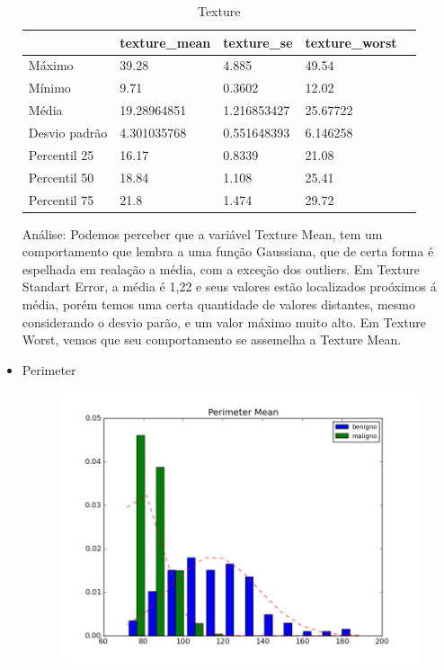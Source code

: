 \documentclass[11pt,a4paper]{article}
\numberwithin{equation}{section}
\begin{document}
\begin{itemize}
\begin{table}[H]
\centering
\caption{Texture}
\label{my-label}
\begin{tabular}{lllll}
\hline
              & texture\_mean & texture\_se & texture\_worst &  \\ \hline
Máximo        & 39.28         & 4.885       & 49.54          &  \\
Mínimo        & 9.71          & 0.3602      & 12.02          &  \\
Média         & 19.28964851   & 1.216853427 & 25.67722       &  \\
Desvio padrão & 4.301035768   & 0.551648393 & 6.146258       &  \\
Percentil 25  & 16.17         & 0.8339      & 21.08          &  \\
Percentil 50  & 18.84         & 1.108       & 25.41          &  \\
Percentil 75  & 21.8          & 1.474       & 29.72          & \\ \hline
\end{tabular}
\end{table}

Análise: Podemos perceber que a variável Texture Mean, tem um comportamento que lembra a uma função Gaussiana, que de certa forma é espelhada em realação a média, com a exceção dos outliers. Em Texture Standart Error, a média é 1,22  e seus valores estão localizados proóximos á média, porém temos uma certa quantidade de valores distantes, mesmo considerando o desvio parão, e um valor máximo muito alto. Em Texture Worst, vemos que seu comportamento se assemelha a Texture Mean.


\item Perimeter
\begin{figure}[H]
\centering
  \includegraphics[width=.5\linewidth]{../img/hist/perimeter_mean}
  \label{fig:test1}
\end{figure}%


\end{itemize}
\end{document}
